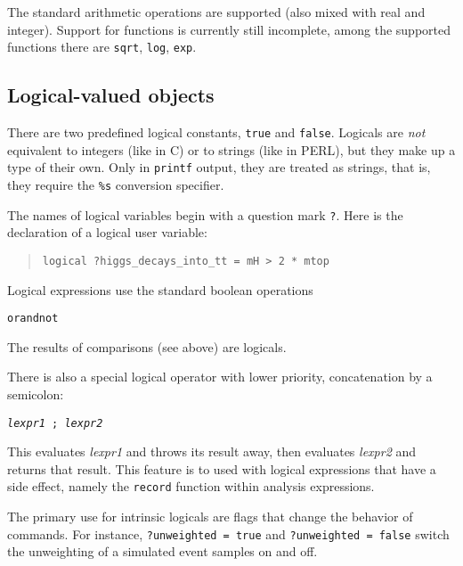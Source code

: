 \documentclass[12pt]{book}
\newcommand{\ttt}[1]{\texttt{#1}}
\begin{document}
The standard arithmetic operations are supported (also mixed with real and
integer).  Support for functions is currently still incomplete, among the
supported functions there are \ttt{sqrt}, \ttt{log}, \ttt{exp}.



\subsection{Logical-valued objects}

There are two predefined logical constants, \ttt{true} and \ttt{false}.
Logicals are \emph{not} equivalent to integers (like in C) or to strings (like
in PERL), but they make up a type of their own.  Only in \verb|printf| output,
they are treated as strings, that is, they require the \verb|%s| conversion
specifier.

The names of logical variables begin with a question mark \ttt{?}.  Here is
the declaration of a logical user variable:
\begin{quote}
\begin{footnotesize}
\begin{footnotesize}
\begin{verbatim}
logical ?higgs_decays_into_tt = mH > 2 * mtop  
\end{verbatim}
\end{footnotesize}
\end{footnotesize}
\end{quote}

Logical expressions use the standard boolean operations
\begin{center}
  \ttt{or}\quad \ttt{and}\quad \ttt{not}
\end{center}
The results of comparisons (see above) are logicals.

There is also a special logical operator with lower priority, concatenation by
a semicolon:
\begin{center}
  \ttt{\textit{lexpr1} ; \textit{lexpr2}}
\end{center}
This evaluates \textit{lexpr1} and throws its result away, then evaluates
\textit{lexpr2} and returns that result.  This feature is to used with logical
expressions that have a side effect, namely the \ttt{record} function within
analysis expressions.

The primary use for intrinsic logicals are flags that change the behavior of
commands.  For instance, \ttt{?unweighted = true} and \ttt{?unweighted =
  false} switch the unweighting of a simulated event samples on and off.
\end{document}
